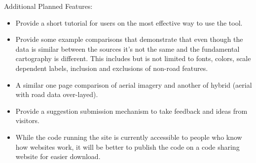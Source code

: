 \documentclass[12pt,letterpaper]{article}
\begin{document}
Additional Planned Features:
\begin{itemize}
\item Provide a short tutorial for users on the most effective way to use the tool.
\item Provide some example comparisons that demonstrate that even though the data is similar between the sources it's not the same and the fundamental cartography is different. This includes but is not limited to fonts, colors, scale dependent labels, inclusion and exclusions of non-road features.
\item A similar one page comparison of aerial imagery and another of hybrid (aerial with road data over-layed).
\item Provide a suggestion submission mechanism to take feedback and ideas from visitors.
\item While the code running the site is currently accessible to people who know how websites work, it will be better to publish the code on a code sharing website for easier download.
\end{itemize}


\end{document}
